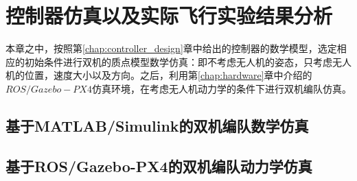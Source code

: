 \chapter{控制器仿真以及实际飞行实验结果分析}
\label{chap:simulatin_expermient}
本章之中，按照第\ref{chap:controller_design}章中给出的控制器的数学模型，选定相应的初始条件进行双机的质点模型数学仿真：即不考虑无人机的姿态，只考虑无人机的位置，速度大小以及方向。之后，利用第\ref{chap:hardware}章中介绍的$ROS/Gazebo-PX4$仿真环境，在考虑无人机动力学的条件下进行双机编队仿真。
\section{基于MATLAB/Simulink的双机编队数学仿真}
\section{基于ROS/Gazebo-PX4的双机编队动力学仿真}